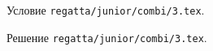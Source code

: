 \problem
Условие \texttt{regatta/junior/combi/3.tex}.

\solution Решение \texttt{regatta/junior/combi/3.tex}.
\endproblem
